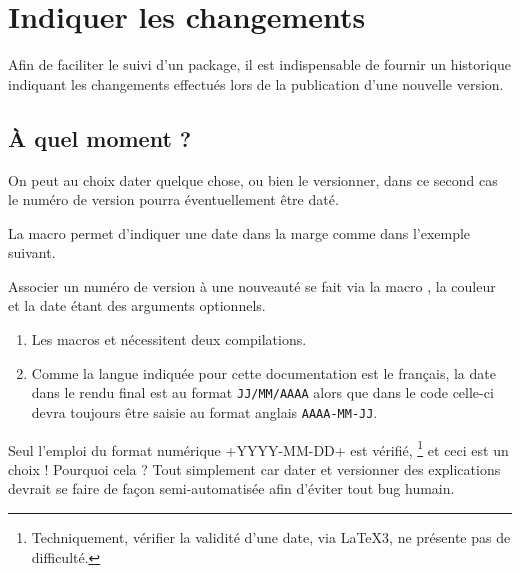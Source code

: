 \documentclass[10pt, a4paper]{article}
\begin{document}
\section{Indiquer les changements}

Afin de faciliter le suivi d'un package, il est indispensable de fournir un historique indiquant les changements effectués lors de la publication d'une nouvelle version.




\subsection{À quel moment ?}

On peut au choix dater quelque chose, ou bien le versionner, dans ce second cas le numéro de version pourra éventuellement être daté.




\begin{tdocexa}
    La macro  permet d'indiquer une date dans la marge comme dans l'exemple suivant.

\end{tdocexa}




\begin{tdocexa}
    Associer un numéro de version à une nouveauté se fait via la macro , la couleur et la date étant des arguments optionnels.

\end{tdocexa}


\begin{tdocimportant}
    \leavevmode

    \begin{enumerate}
        \item Les macros  et  nécessitent deux compilations.

        \item Comme la langue indiquée pour cette documentation est le français, la date dans le rendu final est au format \texttt{JJ/MM/AAAA} alors que dans le code celle-ci devra toujours être saisie au format anglais \texttt{AAAA-MM-JJ}.
    \end{enumerate}
\end{tdocimportant}


\begin{tdocwarn}
    Seul l'emploi du format numérique \tdocinlatex+YYYY-MM-DD+ est vérifié,
    \footnote{
        Techniquement, vérifier la validité d'une date, via \LaTeX3, ne présente pas de difficulté.
    }
    et ceci est un choix ! Pourquoi cela ? Tout simplement car dater et versionner des explications devrait se faire de façon semi-automatisée afin d'éviter tout bug humain.
\end{tdocwarn}
\end{document}
